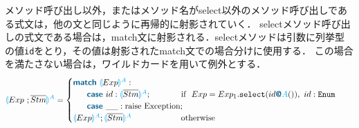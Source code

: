 \documentclass{thesis}
\newcommand{\projection}[2]{{\color{cyan}\llparenthesis}#1{\color{cyan}\rrparenthesis^#2}}
\newcommand{\mblue}[1]{\textbf{\textsf{\color{MidnightBlue}#1}}}
\newcommand{\cyan}[1]{\color{cyan}#1}
\begin{document}
メソッド呼び出し以外，またはメソッド名が\textsf{select}以外のメソッド呼び出しである式文は，他の文と同じように再帰的に射影されていく．
\textsf{select}メソッド呼び出しの式文である場合は，\textsf{match}文に射影される．\textsf{select}メソッドは引数に列挙型の値\texttt{id}をとり，その値は射影されたmatch文での場合分けに使用する．
この場合を満たさない場合は，ワイルドカードを用いて例外とする．
\begin{alignat*}{2} 
  &\projection{Exp~;\overline{Stm}}{A} =
  \begin{cases}
    \mblue{match} ~\projection{Exp}{A}: \\
    ~~~~~\mblue{case} ~id: \projection{\overline{Stm}}{A};~~~~~~~~~~~ \text{if}~~Exp = Exp_1.\texttt{select}(id\mblue{@}{\cyan{A}}()),~ id:\texttt{Enum}\\ %
    ~~~~~\mblue{case} ~\_\_: \text{raise Exception}; \\
    \projection{Exp}{A};\projection{\overline{Stm}}{A} ~~~~~~~~~~~~~~~~~~ \text{otherwise}\\
  \end{cases}
\end{alignat*}
\end{document}
